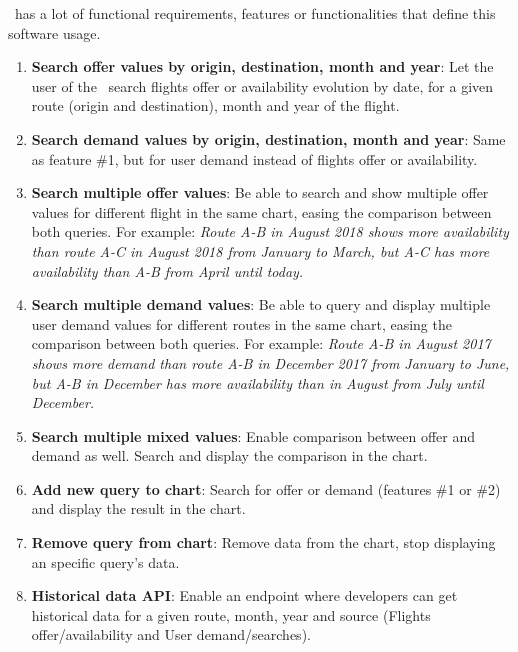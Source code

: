 \thesis\ has a lot of functional requirements, features or functionalities that define this software usage. 

\begin{enumerate}
    \item \textbf{Search offer values by origin, destination, month and year}: Let the user of the \thesis\ search flights offer or availability evolution by date, for a given route (origin and destination), month and year of the flight.
    \\
    \item \textbf{Search demand values by origin, destination, month and year}: Same as feature \#1, but for user demand instead of flights offer or availability.
    \\
    \item \textbf{Search multiple offer values}: Be able to search and show multiple offer values for different flight in the same chart, easing the comparison between both queries. For example: \textit{Route A-B in August 2018 shows more availability than route A-C in August 2018 from January to March, but A-C has more availability than A-B from April until today.}
    \\
    \item \textbf{Search multiple demand values}: Be able to query and display multiple user demand values for different routes in the same chart, easing the comparison between both queries. For example: \textit{Route A-B in August 2017 shows more demand than route A-B in December 2017 from January to June, but A-B in December has more availability than in August from July until December.}
    \\
    \item \textbf{Search multiple mixed values}: Enable comparison between offer and demand as well. Search and display the comparison in the chart.
    \\
    \item \textbf{Add new query to chart}: Search for offer or demand (features \#1 or \#2) and display the result in the chart.
    \\
    \item \textbf{Remove query from chart}: Remove data from the chart, stop displaying an specific query's data.
    \\
    \item \textbf{Historical data API}: Enable an endpoint where developers can get historical data for a given route, month, year and source (Flights offer/availability and User demand/searches).
\end{enumerate}

